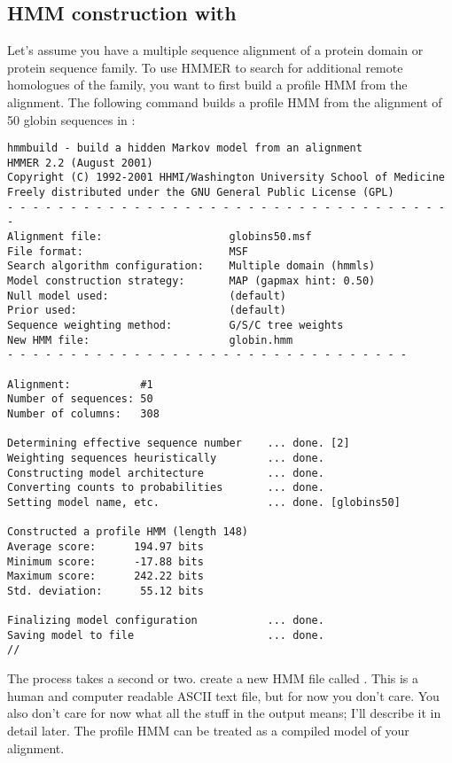 \subsection{HMM construction with }

Let's assume you have a multiple sequence alignment of a protein
domain or protein sequence family. To use HMMER to search for
additional remote homologues of the family, you want to first build a
profile HMM from the alignment. The following command builds a profile
HMM from the alignment of 50 globin sequences in :

\vspace{1.5em}
\vspace{-1.5em}
{\small\begin{verbatim}
hmmbuild - build a hidden Markov model from an alignment
HMMER 2.2 (August 2001)
Copyright (C) 1992-2001 HHMI/Washington University School of Medicine
Freely distributed under the GNU General Public License (GPL)
- - - - - - - - - - - - - - - - - - - - - - - - - - - - - - - - - - - -
Alignment file:                    globins50.msf
File format:                       MSF
Search algorithm configuration:    Multiple domain (hmmls)
Model construction strategy:       MAP (gapmax hint: 0.50)
Null model used:                   (default)
Prior used:                        (default)
Sequence weighting method:         G/S/C tree weights
New HMM file:                      globin.hmm 
- - - - - - - - - - - - - - - - - - - - - - - - - - - - - - - -

Alignment:           #1
Number of sequences: 50
Number of columns:   308

Determining effective sequence number    ... done. [2]
Weighting sequences heuristically        ... done.
Constructing model architecture          ... done.
Converting counts to probabilities       ... done.
Setting model name, etc.                 ... done. [globins50]

Constructed a profile HMM (length 148)
Average score:      194.97 bits
Minimum score:      -17.88 bits
Maximum score:      242.22 bits
Std. deviation:      55.12 bits

Finalizing model configuration           ... done.
Saving model to file                     ... done.
//
\end{verbatim}}

The process takes a second or two.   create a new HMM
file called . This is a human and computer readable
ASCII text file, but for now you don't care. You also don't care for
now what all the stuff in the output means; I'll describe it in detail
later. The profile HMM can be treated as a compiled model of your
alignment.

